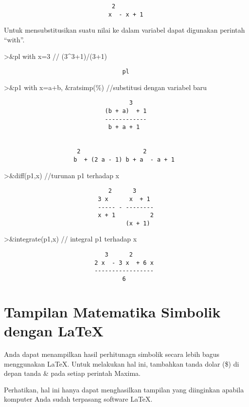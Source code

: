 \documentclass[
]{book}
\begin{document}
\begin{verbatim}
                               2
                              x  - x + 1
\end{verbatim}

Untuk mensubstitusikan suatu nilai ke dalam variabel dapat digunakan perintah ``with''.

\textgreater\&pl with x=3 // (3\^{}3+1)/(3+1)

\begin{verbatim}
                                  pl
\end{verbatim}

\textgreater\&p1 with x=a+b, \&ratsimp(\%) //substitusi dengan variabel baru

\begin{verbatim}
                                    3
                             (b + a)  + 1
                             ------------
                              b + a + 1


                     2                  2
                    b  + (2 a - 1) b + a  - a + 1
\end{verbatim}

\textgreater\&diff(p1,x) //turunan p1 terhadap x

\begin{verbatim}
                              2      3
                           3 x      x  + 1
                           ----- - --------
                           x + 1          2
                                   (x + 1)
\end{verbatim}

\textgreater\&integrate(p1,x) // integral p1 terhadap x

\begin{verbatim}
                             3      2
                          2 x  - 3 x  + 6 x
                          -----------------
                                  6
\end{verbatim}

\chapter{Tampilan Matematika Simbolik dengan LaTeX}\label{tampilan-matematika-simbolik-dengan-latex}

Anda dapat menampilkan hasil perhitunagn simbolik secara lebih bagus menggunakan LaTeX. Untuk melakukan hal ini, tambahkan tanda dolar (\$) di depan tanda \& pada setiap perintah Maxima.

Perhatikan, hal ini hanya dapat menghasilkan tampilan yang diinginkan apabila komputer Anda sudah terpasang software LaTeX.
\end{document}

